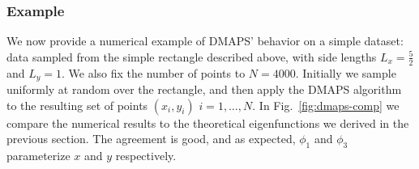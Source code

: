 




\subsubsection{Example}

We now provide a numerical example of DMAPS' behavior on a simple
dataset: data sampled from the simple rectangle described above, with
side lengths $L_x = \frac{5}{2}$ and $L_y = 1$. We also fix the number
of points to $N = 4000$. Initially we sample uniformly at random over
the rectangle, and then apply the DMAPS algorithm to the resulting set
of points $(x_i, y_i)$ $i = 1, \dots, N$. In Fig.~\ref{fig:dmaps-comp}
we compare the numerical results to the theoretical eigenfunctions we
derived in the previous section. The agreement is good, and as
expected, $\phi_1$ and $\phi_3$ parameterize $x$ and $y$ respectively.

